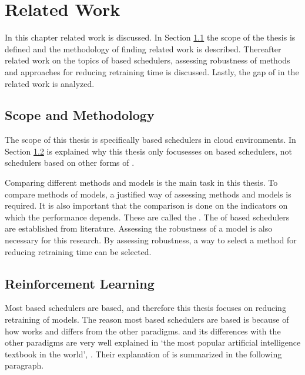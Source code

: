 \chapter{Related Work}

In this chapter related work is discussed. In Section \ref{sec:scope} the
scope of the thesis is defined and the methodology of finding related work is
described. Thereafter related work on the topics of \rl based schedulers,
assessing robustness of \rl methods and approaches for reducing retraining
time is discussed. Lastly, the gap of in the related work is analyzed.


\section{Scope and Methodology}\label{sec:scope}

The scope of this thesis is specifically \rl based schedulers in cloud
environments. In Section \ref{sec:rl} is explained why this thesis only
focusesses on \rl based schedulers, not schedulers based on other forms of
\ml.

Comparing different methods and models is the main task in this thesis. To
compare methods of models, a justified way of assessing methods and models is
required. It is also important that the comparison is done on the indicators
on which the performance depends. These are called the \kpis. The \kpis of \rl
based schedulers are established from literature. Assessing the robustness of
a model is also necessary for this research. By assessing robustness, a way to
select a method for reducing retraining time can be selected.


\section{Reinforcement Learning}\label{sec:rl}

Most \ml based schedulers are \rl based, and therefore this thesis focuses on
reducing retraining of \rl models. The reason most \ml based schedulers are
\rl based is because of how \rl works and differs from the other \ml
paradigms. \rl and its differences with the other paradigms are very well
explained in `the most popular artificial intelligence textbook in the
world'\footnotemark, . Their explanation of \rl is
summarized in the following paragraph.



